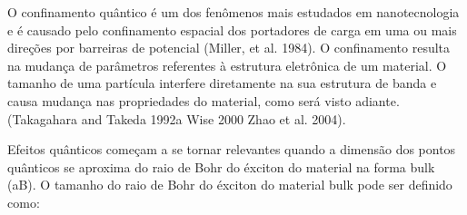 \par O confinamento quântico é um  dos fenômenos mais estudados em nanotecnologia e é causado pelo confinamento espacial dos portadores de carga em uma ou mais direções por barreiras de potencial (Miller, et al. 1984). O confinamento resulta na mudança de parâmetros referentes à estrutura eletrônica de um material. O tamanho de uma partícula interfere diretamente na sua estrutura de banda e causa mudança nas propriedades do material, como será visto adiante. (Takagahara and Takeda  1992a Wise  2000 Zhao  et  al.  2004).

\par Efeitos quânticos começam a se tornar relevantes quando a dimensão dos pontos quânticos se aproxima do raio de Bohr do éxciton do material na forma bulk (aB). O tamanho do raio de Bohr do éxciton do material bulk pode ser definido como:
